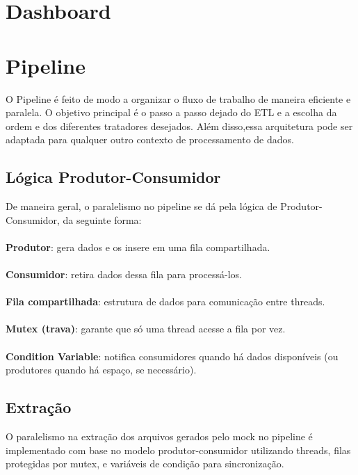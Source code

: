 \documentclass[a4paper,12pt]{article}
\begin{document}
\section{Dashboard}

\section{Pipeline}
O Pipeline é feito de modo a organizar o fluxo de trabalho de maneira eficiente e paralela. O objetivo principal é o passo a passo dejado do ETL e a escolha da ordem e dos diferentes tratadores desejados. Além disso,essa arquitetura pode ser adaptada para qualquer outro contexto de processamento de dados.

\subsection*{Lógica Produtor-Consumidor}
De maneira geral, o paralelismo no pipeline se dá pela lógica de Produtor-Consumidor, da seguinte forma:
\\
\\
\textbf{Produtor}: gera dados e os insere em uma fila compartilhada.
\\
\\
\textbf{Consumidor}: retira dados dessa fila para processá-los.
\\
\\
\textbf{Fila compartilhada}: estrutura de dados para comunicação entre threads.
\\
\\
\textbf{Mutex (trava)}: garante que só uma thread acesse a fila por vez.
\\
\\
\textbf{Condition Variable}: notifica consumidores quando há dados disponíveis (ou produtores quando há espaço, se necessário).



\subsection*{Extração}
O paralelismo na extração dos arquivos gerados pelo mock no pipeline é implementado com base no modelo produtor-consumidor utilizando threads, filas protegidas por mutex, e variáveis de condição para sincronização.
\end{document}
